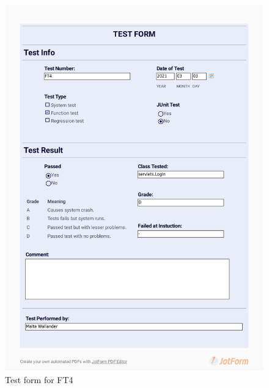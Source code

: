 \documentclass{article}
\begin{document}
 \begin{figure}
     \centering
     \includegraphics[width=13cm]{images/2021-03-03_Malte_FT4-1}
     \renewcommand\figurename{Figure}
     \caption{Test form for FT4}
     \label{fig:my_label}
 \end{figure}
\end{document}
